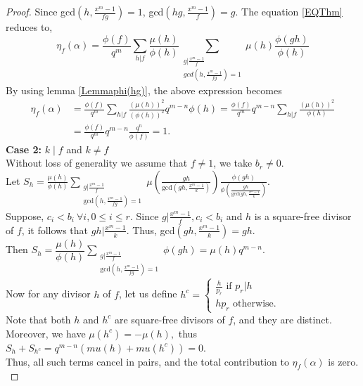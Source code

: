 \documentclass[12pt,a4paper]{article}
\theoremstyle{plain}
\theoremstyle{definition}
\numberwithin{equation}{section}
\begin{document}
\begin{proof}
         Since gcd$(h,\frac{x^m-1}{fg}) = 1$, gcd$(hg,\frac{x^m-1}{f})=g$. The equation \ref{EQThm} reduces to,
         $$\eta_f(\alpha)= \frac{\phi(f)}{q^m}\sum_{h\vert f} \frac{\mu(h)}{\phi(h)} \sum_{\substack{g \vert \frac{x^m-1}{f}\\ gcd(h,\frac{x^m-1}{fg}) =1} } \mu(h) \frac{\phi(gh)}{\phi(h)} $$
         By using lemma \ref{Lemmaphi(hg)}, the above expression becomes
         \begin{align*}
             \eta_f(\alpha) &=\frac{\phi(f)}{q^m}\sum_{h\vert f} \frac{(\mu(h))^2}{(\phi(h))^2}q^{m-n}\phi(h)=\frac{\phi(f)}{q^m}q^{m-n}\sum_{h\vert f} \frac{(\mu(h))^2}{\phi(h)} \\
             & =\frac{\phi(f)}{q^m}q^{m-n}\frac{q^n}{\phi(f)} = 1.
         \end{align*}
         \textbf{Case 2:} $k \mid f$ and $k \neq f$\\
         Without loss of generality we assume that $f \neq 1$, we take $b_r \neq 0$.\\
        Let $S_h = \displaystyle\frac{\mu(h)}{\phi(h)}\sum_{\substack{g \vert \frac{x^m-1}{f} \\ \text{gcd}(h,\frac{x^m-1}{fg})=1}} \mu\left( \frac{gh}{\text{gcd}(gh,\frac{x^m-1}{k})}\right)\frac{\phi(gh)}{\phi\left( \frac{gh}{\text{gcd}(gh,\frac{x^m-1}{k}}\right)}$.\\
        Suppose, $c_i<b_i ~ \forall i, 0 \leq i \leq r.$
        Since $g \vert \frac{x^m-1}{f}, c_i<b_i$ and $h$ is a square-free divisor of $f$, it follows that $gh \vert \frac{x^m-1}{k}$. Thus, gcd$(gh,\frac{x^m-1}{k})= gh.$\\
        Then $S_h = \dfrac{\mu(h)}{\phi(h)} \displaystyle \sum_{\substack{g \vert \frac{x^m-1}{f} \\ \text{gcd}(h,\frac{x^m-1}{fg})=1}} \phi(gh) = \mu(h) q^{m-n}$.\\
        Now for any divisor $h$ of $f$, let us define $h^c = \begin{cases}
            \frac{h}{p_r} \text{ if } p_r \vert h \\
            hp_r \text{ otherwise}.
        \end{cases}$\\
        Note that both $h$ and $h^c$ are square-free divisors of $f$, and they are distinct. Moreover, we have $\mu(h^c) = -\mu(h),$
        thus $S_h + S_{h^c} = q^{m-n}(mu(h) + mu(h^c)) = 0$.\\
        Thus, all such terms cancel in pairs, and the total contribution to $\eta_f(\alpha)$ is zero.\\

\end{proof}
\end{document}
